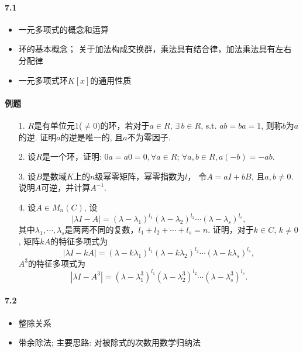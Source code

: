 \paragraph{7.1}
\begin{itemize}
  \item 一元多项式的概念和运算
  \item 环的基本概念； 关于加法构成交换群，乘法具有结合律，加法乘法具有左右分配律
  \item 一元多项式环$K[x]$的通用性质
\end{itemize}

\paragraph{例题}
\begin{itemize}
  \item[1.] $R$是有单位元$1$($\ne 0$)的环，若对于$a\in R$, $\exists \,b \in R$, s.t.
$ab = ba = 1$, 则称$b$为$a$的逆. 证明$a$的逆是唯一的, 且$a$不为零因子.
  \vspace{1cm}

  \item[2.] 设$R$是一个环，证明: $0a = a0 = 0, \forall a\in R$;
  $\forall a, b \in R, a(-b)=-ab$.
  \vspace{1cm}
  
  \item[3.] 设$B$是数域$K$上的$n$级幂零矩阵，幂零指数为$l$， 令$A=aI+bB$, 且$a,b \ne 0$.
  说明$A$可逆，并计算$A^{-1}$.
  \vspace{2cm}

  \item[4.] 设$A\in M_n(C)$, 设
  $$|\lambda I - A| = (\lambda - \lambda_1)^{l_1}(\lambda - \lambda_2)^{l_2}\cdots(\lambda - \lambda_s)^{l_s},$$
  其中$\lambda_1,\cdots,\lambda_s$是两两不同的复数，$l_1 + l_2 + \cdots + l_s = n$.
  证明，对于$k \in C$, $k \ne 0$, 矩阵$kA$的特征多项式为
  $$|\lambda I - kA| = (\lambda - k\lambda_1)^{l_1}(\lambda - k\lambda_2)^{l_2}\cdots(\lambda - k\lambda_s)^{l_s},$$
  $A^3$的特征多项式为
  $$|\lambda I - A^3| = (\lambda - \lambda_1^3)^{l_1}(\lambda - \lambda_2^3)^{l_2}\cdots(\lambda - \lambda_s^3)^{l_s}.$$
  \vspace{3cm}
\end{itemize}

\vspace{0.5cm}
\paragraph{7.2}
\begin{itemize}
  \item 整除关系
  \item 带余除法; 主要思路: 对被除式的次数用数学归纳法
\end{itemize}

